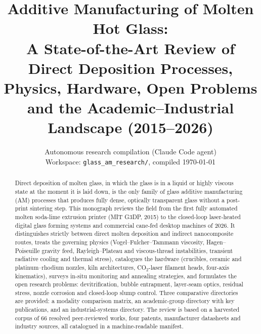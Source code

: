 \documentclass[10pt,a4paper]{article}
\title{\textbf{Additive Manufacturing of Molten Hot Glass:\\ A State-of-the-Art Review of Direct Deposition Processes, Physics, Hardware, Open Problems and the Academic--Industrial Landscape (2015--2026)}}
\author{Autonomous research compilation (Claude Code agent)\\ \small Workspace: \texttt{glass\_am\_research/}, compiled \today}
\date{}
\begin{document}
\maketitle

\begin{abstract}
\noindent Direct deposition of molten glass, in which the glass is in a liquid or highly viscous state at the moment it is laid down, is the only family of glass additive manufacturing (AM) processes that produces fully dense, optically transparent glass without a post-print sintering step. This monograph reviews the field from the first fully automated molten soda-lime extrusion printer (MIT G3DP, 2015) to the closed-loop laser-heated digital glass forming systems and commercial cane-fed desktop machines of 2026. It distinguishes strictly between direct molten deposition and indirect nanocomposite routes, treats the governing physics (Vogel--Fulcher--Tammann viscosity, Hagen--Poiseuille gravity feed, Rayleigh--Plateau and viscous-thread instabilities, transient radiative cooling and thermal stress), catalogues the hardware (crucibles, ceramic and platinum--rhodium nozzles, kiln architectures, CO$_2$-laser filament heads, four-axis kinematics), surveys in-situ monitoring and annealing strategies, and formulates the open research problems: devitrification, bubble entrapment, layer-seam optics, residual stress, nozzle corrosion and closed-loop slump control. Three comparative directories are provided: a modality comparison matrix, an academic-group directory with key publications, and an industrial-systems directory. The review is based on a harvested corpus of 66 resolved peer-reviewed works, four patents, manufacturer datasheets and industry sources, all catalogued in a machine-readable manifest.
\end{abstract}

\tableofcontents
\clearpage










\clearpage


\end{document}
